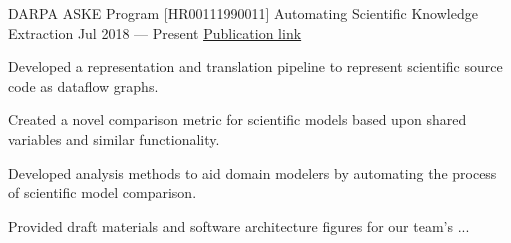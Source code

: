 
\vspace{-0.25cm}

\begin{cventries}


  \cventry
    {DARPA ASKE Program [HR00111990011]} %
    {Automating Scientific Knowledge Extraction} %
    {Jul 2018 --- Present} %
    {\href{https://www.semanticscholar.org/paper/AutoMATES\%3A-Automated-Model-Assembly-from-Text\%2C-and-Pyarelal-Valenzuela-Escarcega/0da632ea0d740110ee6981570f90aba968b71aa8}{\underline{Publication link}}} %
    {
      \vspace{-0.15cm}
      \begin{cvitems} %
        \item Developed a representation and translation pipeline to represent scientific source code as dataflow graphs.
        \item Created a novel comparison metric for scientific models based upon shared variables and similar functionality.
        \item Developed analysis methods to aid domain modelers by automating the process of scientific model comparison.
        \item Provided draft materials and software architecture figures for our team's ...
      \end{cvitems}
    }


\end{cventries}
